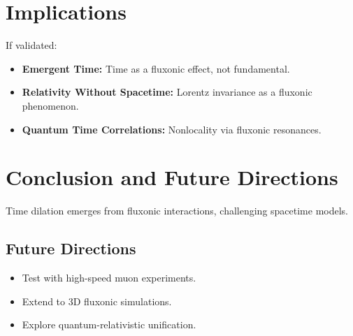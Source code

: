 \documentclass{article}
\begin{document}
\section{Implications}
If validated:
\begin{itemize}
    \item \textbf{Emergent Time:} Time as a fluxonic effect, not fundamental.
    \item \textbf{Relativity Without Spacetime:} Lorentz invariance as a fluxonic phenomenon.
    \item \textbf{Quantum Time Correlations:} Nonlocality via fluxonic resonances.
\end{itemize}

\section{Conclusion and Future Directions}
Time dilation emerges from fluxonic interactions, challenging spacetime models.

\subsection{Future Directions}
\begin{itemize}
    \item Test with high-speed muon experiments.
    \item Extend to 3D fluxonic simulations.
    \item Explore quantum-relativistic unification.
\end{itemize}
\end{document}
